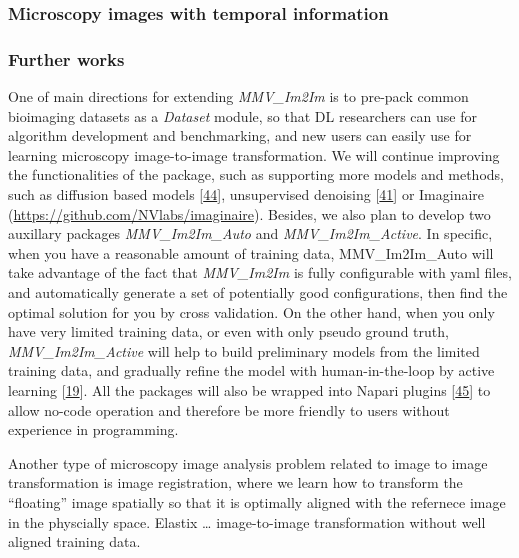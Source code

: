 \hypertarget{microscopy-images-with-temporal-information}{%
\subsubsection{Microscopy images with temporal information}\label{microscopy-images-with-temporal-information}}

\hypertarget{further-works}{%
\subsubsection{Further works}\label{further-works}}

One of main directions for extending \emph{MMV\_Im2Im} is to pre-pack common bioimaging datasets as a \emph{Dataset} module, so that DL researchers can use for algorithm development and benchmarking, and new users can easily use for learning microscopy image-to-image transformation. We will continue improving the functionalities of the package, such as supporting more models and methods, such as diffusion based models {[}\protect\hyperlink{ref-1A3yurr7m}{44}{]}, unsupervised denoising {[}\protect\hyperlink{ref-4vnyY9J9}{41}{]} or Imaginaire (\url{https://github.com/NVlabs/imaginaire}). Besides, we also plan to develop two auxillary packages \emph{MMV\_Im2Im\_Auto} and \emph{MMV\_Im2Im\_Active}. In specific, when you have a reasonable amount of training data, MMV\_Im2Im\_Auto will take advantage of the fact that \emph{MMV\_Im2Im} is fully configurable with yaml files, and automatically generate a set of potentially good configurations, then find the optimal solution for you by cross validation. On the other hand, when you only have very limited training data, or even with only pseudo ground truth, \emph{MMV\_Im2Im\_Active} will help to build preliminary models from the limited training data, and gradually refine the model with human-in-the-loop by active learning {[}\protect\hyperlink{ref-jM3v1UjQ}{19}{]}. All the packages will also be wrapped into Napari plugins {[}\protect\hyperlink{ref-YEMgt2T4}{45}{]} to allow no-code operation and therefore be more friendly to users without experience in programming.

Another type of microscopy image analysis problem related to image to image transformation is image registration, where we learn how to transform the ``floating'' image spatially so that it is optimally aligned with the refernece image in the physcially space. Elastix \ldots{} image-to-image transformation without well aligned training data.

